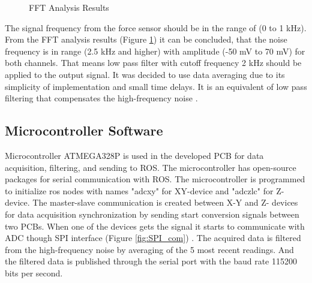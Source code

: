 \begin{figure}[h]%
\centering
{}%
\qquad
{}%
\caption{FFT Analysis Results}
\label{fig:FFT_res}
\end{figure}
	
	The signal frequency from the force sensor should be in the range of (0 to 1 kHz). From the FFT analysis results (Figure \ref{fig:FFT_res}) it can be concluded, that the noise frequency is in range (2.5 kHz and higher) with amplitude (-50 mV to 70 mV) for both channels. That means low pass filter with cutoff frequency 2 kHz should be applied to the output signal. It was decided to use data averaging due to its simplicity of implementation and small time delays. It is an equivalent of low pass filtering that compensates the high-frequency noise \cite{filtering_mov_ave}.

	\subsection{Microcontroller Software}
	\label{sec:MicrSoft}
	Microcontroller ATMEGA328P is used in the developed PCB for data acquisition, filtering, and sending to ROS. The microcontroller has open-source packages for serial communication with ROS. The microcontroller is programmed to initialize ros nodes with names "adc\textunderscore xy" for XY-device and "adc\textunderscore zlc" for Z-device. The master-slave communication is created between X-Y and Z- devices for data acquisition synchronization by sending start conversion signals between two PCBs. When one of the devices gets the signal it starts to communicate with ADC though SPI interface (Figure \ref{fig:SPI_com}) \cite{introduction_SPI}. The acquired data is filtered from the high-frequency noise by averaging of the 5 most recent readings. And the filtered data is published through the serial port with the baud rate 115200 bits per second. 
	
